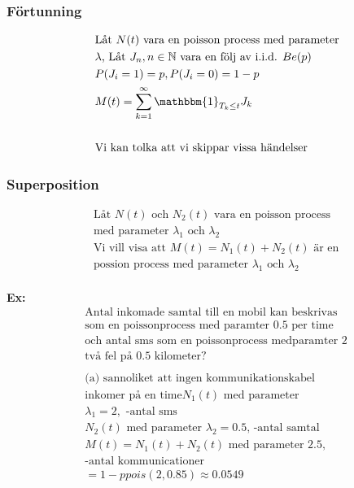 \begin{multicols}{2}
\subsubsection{Förtunning}
\begin{align*}
  &\quad  \text{Låt $N(t)$ vara en poisson process med parameter} \\
  &\quad  \text{$\lambda$, Låt ${J_n, n\in\mathbb{N}}$ vara en följ av i.i.d. $Be(p)$ } \\
  &\quad  P(J_i=1)=p, P(J_i=0)=1-p \\
  &\quad  M(t) = \sum_{k=1}^{\infty} \mathbbm{1}_{T_k\leq t}J_k \\
  &\quad  \\
  &\quad  \text{Vi kan tolka att vi skippar vissa händelser} \\
\end{align*}

\subsubsection{Superposition}
\begin{align*}
  &\text{Låt ${N(t)}$ och ${N_2(t)}$ vara en poisson process} \\
  &\text{med parameter $\lambda_1$ och $\lambda_2$} \\
  &\text{Vi vill visa att $M(t)=N_1(t)+N_2(t)$ är en} \\
  &\text{possion process med parameter $\lambda_1$ och $\lambda_2$} \\
\end{align*}

\textbf{Ex:}
\begin{align*}
  &\text{Antal inkomade samtal till en mobil kan beskrivas} \\
  &\text{som en poissonprocess med paramter $0.5$ per time} \\
  &\text{och antal sms som en poissonprocess medparamter 2} \\
  &\text{två fel på $0.5$ kilometer?} \\
  &\\
  &\text{(a) sannoliket att ingen kommunikationskabel} \\
  &\text{inkomer på en time} N_1(t) \text{ med parameter} \\
  &\lambda_1=2, \text{ -antal sms} \\
  &N_2(t) \text{ med parameter $\lambda_2=0.5$, -antal samtal} \\
  &M(t)=N_1(t)+N_2(t) \text{ med parameter $2.5$,} \\
  &\text{-antal kommunicationer} \\
  &= 1-ppois(2, 0.85) \approx 0.0549 \\
\end{align*}


\end{multicols}
